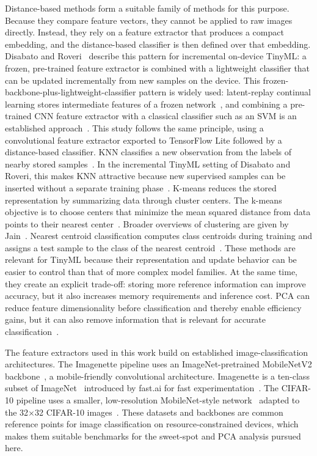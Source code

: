 \documentclass[sigconf,review,nonacm]{acmart}
\begin{document}
Distance-based methods form a suitable family of methods for this purpose.
Because they compare feature vectors, they cannot be applied to raw images directly. Instead, they rely on a feature extractor that produces a compact embedding, and the distance-based classifier is then defined over that embedding.
Disabato and Roveri~\cite{disabato2020incremental} describe this pattern for incremental on-device TinyML: a frozen, pre-trained feature extractor is combined with a lightweight classifier that can be updated incrementally from new samples on the device.
This frozen-backbone-plus-lightweight-classifier pattern is widely used: latent-replay continual learning stores intermediate features of a frozen network~\cite{ravaglia2021tinyml}, and combining a pre-trained CNN feature extractor with a classical classifier such as an SVM is an established approach~\cite{shima2018augmentation}.
This study follows the same principle, using a convolutional feature extractor exported to TensorFlow Lite followed by a distance-based classifier.
KNN classifies a new observation from the labels of nearby stored samples~\cite{cover1967nearest}. In the incremental TinyML setting of Disabato and Roveri, this makes KNN attractive because new supervised samples can be inserted without a separate training phase~\cite{disabato2020incremental}.
K-means reduces the stored representation by summarizing data through cluster centers. The k-means objective is to choose centers that minimize the mean squared distance from data points to their nearest center~\cite{lloyd1982least,kanungo2002efficient}. Broader overviews of clustering are given by Jain~\cite{jain2010clustering}.
Nearest centroid classification computes class centroids during training and assigns a test sample to the class of the nearest centroid~\cite{calafiore2019sparse,manning2008introduction}.
These methods are relevant for TinyML because their representation and update behavior can be easier to control than that of more complex model families.
At the same time, they create an explicit trade-off: storing more reference information can improve accuracy, but it also increases memory requirements and inference cost.
PCA can reduce feature dimensionality before classification and thereby enable efficiency gains, but it can also remove information that is relevant for accurate classification~\cite{geron2019handson}.

The feature extractors used in this work build on established image-classification architectures.
The Imagenette pipeline uses an ImageNet-pretrained MobileNetV2 backbone~\cite{sandler2018mobilenetv2}, a mobile-friendly convolutional architecture.
Imagenette is a ten-class subset of ImageNet~\cite{deng2009imagenet} introduced by fast.ai for fast experimentation~\cite{howard2019imagenette}.
The CIFAR-10 pipeline uses a smaller, low-resolution MobileNet-style network~\cite{yuan2022lowres} adapted to the 32$\times$32 CIFAR-10 images~\cite{krizhevsky2009cifar}.
These datasets and backbones are common reference points for image classification on resource-constrained devices, which makes them suitable benchmarks for the sweet-spot and PCA analysis pursued here.
\end{document}
